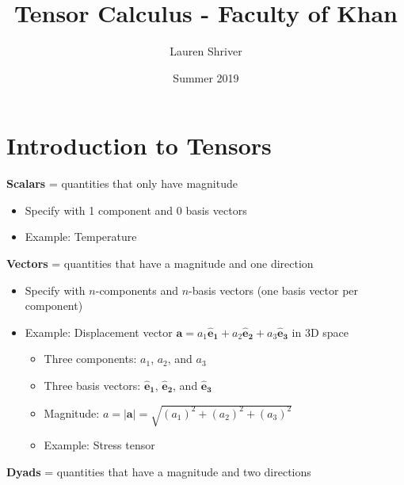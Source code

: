 \documentclass[a4paper]{article}
\title{Tensor Calculus - Faculty of Khan}
\author{Lauren Shriver}
\date{Summer 2019}
\begin{document}
\maketitle

\section{Introduction to Tensors}
\textbf{Scalars} = quantities that only have magnitude
    \begin{itemize}
        \item Specify with 1 component and 0 basis vectors
        \item Example: Temperature
    \end{itemize}
\textbf{Vectors} = quantities that have a magnitude and one direction
    \begin{itemize}
        \item Specify with $n$-components and $n$-basis vectors (one basis vector per component) 
        \item Example: Displacement vector $\mathbf{a} = a_1\mathbf{\hat{e}_1} + a_2\mathbf{\hat{e}_2} + a_3\mathbf{\hat{e}_3}$ in 3D space
            \begin{itemize}
                \item Three components: $a_1$, $a_2$, and $a_3$
                \item Three basis vectors: $\mathbf{\hat{e}_1}$, $\mathbf{\hat{e}_2}$, and $\mathbf{\hat{e}_3}$
                \item Magnitude: $a=\mathbf{|a|}=\sqrt{(a_1)^2 + (a_2)^2 + (a_3)^2}$
                \item Example: Stress tensor
            \end{itemize}
    \end{itemize}
\textbf{Dyads} = quantities that have a magnitude and two directions 

    
 
\end{document}
